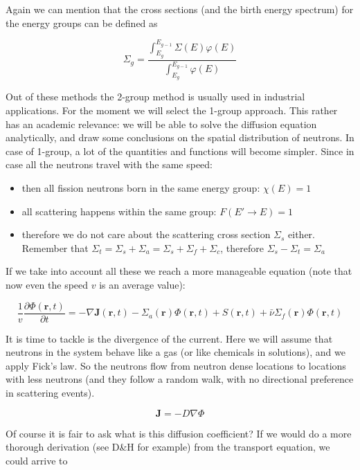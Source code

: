 Again we can mention that the cross sections (and the birth energy spectrum) for the energy groups can be defined as

\begin{equation}
\Sigma_g=\frac{\int_{E_g}^{E_{g-1}}\Sigma(E)\varphi(E)}{\int_{E_g}^{E_{g-1}}\varphi(E)}
\end{equation}
    
Out of these methods the 2-group method is usually used in industrial applications. For the moment we will select the 1-group approach. This rather has an academic relevance: we will be able to solve the diffusion equation analytically, and draw some conclusions on the spatial distribution of neutrons. In case of 1-group, a lot of the quantities and functions will become simpler. Since in case all the neutrons travel with the same speed:

\begin{itemize}
\item then all fission neutrons born in the same energy group: $\chi(E)=1$ 
\item all scattering happens within the same group: $F(E' \rightarrow E)=1$
\item therefore we do not care about the scattering cross section $\Sigma_s$ either. Remember that $\Sigma_t=\Sigma_s+\Sigma_a=\Sigma_s+\Sigma_f+\Sigma_c$, therefore $\Sigma_s-\Sigma_t=\Sigma_a$
\end{itemize} 

If we take into account all these we reach a more manageable equation (note that now even the speed $v$ is an average value):
    
\begin{equation}
\frac{1}{v}\frac{\partial\Phi(\mathbf{r},t)}{\partial t}=-\nabla \mathbf{J}(\mathbf{r},t)-\Sigma_a(\mathbf{r})\Phi(\mathbf{r},t)+S(\mathbf{r},t) 
+\bar\nu\Sigma_f(\mathbf{r})\Phi(\mathbf{r},t)
\end{equation}


It is time to tackle is the divergence of the current. Here we will assume that neutrons in the system behave like a gas (or like chemicals in solutions), and we apply Fick's law. So the neutrons flow from neutron dense locations to locations with less neutrons (and they follow a random walk, with no directional preference in scattering events).

\begin{equation}
\mathbf{J}=-D\nabla \Phi
\end{equation}

Of course it is fair to ask what is this diffusion coefficient? If we would do a more thorough derivation (see D\&H for example) from the transport equation, we could arrive to

